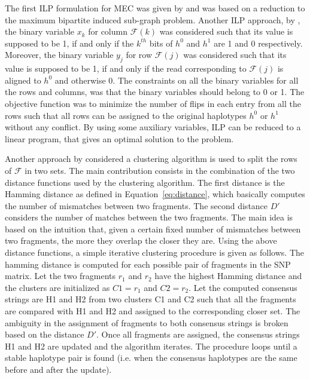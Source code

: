 The first ILP formulation for MEC was given by \cite{Fouilhoux2012} and was based on a reduction to the maximum bipartite induced sub-graph problem. 
Another ILP approach, by \cite{CDW13_exact}, the binary variable $x_k$ for column $\mathcal{F}(k)$ 
was considered such that its value is supposed to be 1, if and only if the $k^{th}$ bits of $h^0$ and $h^1$ are 1 and 0 respectively.
Moreover, the binary variable $y_j$ for row $\mathcal{F}(j)$ was considered such that its value is supposed to be 1, if and only 
if the read corresponding to $\mathcal{F}(j)$ is aligned to $h^0$ and otherwise 0.
The constraints on all the binary variables for all the rows and columns, was that the binary variables should belong to 0 or 1.
The objective function was to minimize the number of flips in each entry from all the rows such that all rows can be assigned to the original haplotypes $h^0$ or $h^1$ without any conflict. 
By using some auxiliary variables, ILP can be reduced to a linear program, that gives an optimal solution to the problem.

Another approach by \cite{wang2007clustering} considered a clustering algorithm is used to split the rows of $\mathcal{F}$ in two sets. 
The main contribution consists in the combination of the two distance functions used by the clustering algorithm. 
The first distance is the Hamming distance as defined in Equation~\ref{eq:distance}, which basically computes the number of mismatches between two fragments. 
The second distance $D'$ considers the number of matches between the two fragments.
The main idea is based on the intuition that, given a certain fixed number of mismatches between two fragments, the more they overlap the closer they are.
Using the above distance functions, a simple iterative clustering procedure is given as follows.
The hamming distance is computed for each possible pair of fragments in the SNP matrix.
Let the two fragments $r_1$ and $r_2$ have the highest Hamming distance and the clusters are initialized as $C1 = r_1$ and $C2 = r_2$.
Let the computed consensus strings are H1 and H2 from two clusters C1 and C2 such that all the fragments are compared with H1 and H2 and assigned to the corresponding closer set. The ambiguity in the assignment of fragments to both consensus strings is broken based on the distance $D'$.
Once all fragments are assigned, the consensus strings H1 and H2 are updated and the algorithm iterates. The procedure loops until a stable haplotype pair is found (i.e. when the consensus haplotypes are the same before and after the update).

